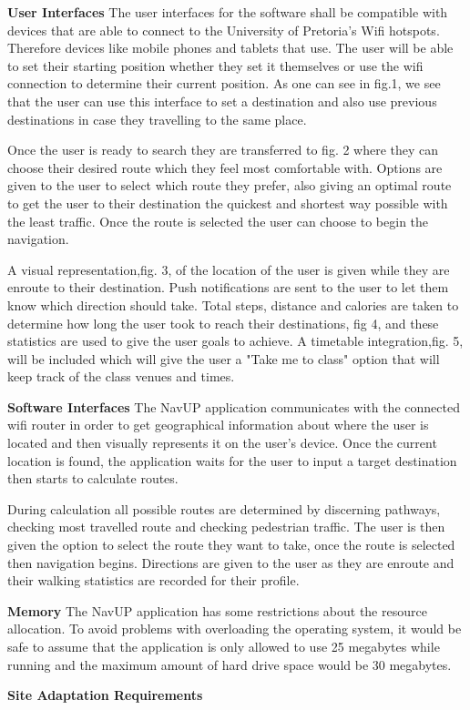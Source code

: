 \textbf{User Interfaces}
The user interfaces for the software shall be compatible with devices that are able to connect to the University of Pretoria's Wifi hotspots. Therefore devices like mobile phones and tablets that use. The user will be able to set their starting position whether they set it themselves or use the wifi connection to determine their current position. As one can see in fig.1, we see that the user can use this interface to set a destination and also use previous destinations in case they travelling to the same place. 

Once the user is ready to search they are transferred to fig. 2 where they can choose their desired route which they feel most comfortable with. Options are given to the user to select which route they prefer, also giving an optimal route to get the user to their destination the quickest and shortest way possible with the least traffic. Once the route is selected the user can choose to begin the navigation.

A visual representation,fig. 3, of the location of the user is given while they are enroute to their destination. Push notifications are sent to the user to let them know which direction should take. Total steps, distance and calories are taken to determine how long the user took to reach their destinations, fig 4, and these statistics are used to give the user goals to achieve. A timetable integration,fig. 5, will be included which will give the user a "Take me to class" option that will keep track of the class venues and times.


\textbf{Software Interfaces}
The NavUP application communicates with the connected wifi router in order to get geographical information about where the user is located and then visually represents it on the user's device. Once the current location is found, the application waits for the user to input a target destination then starts to calculate routes. 

During calculation all possible routes are determined by discerning pathways, checking most travelled route and checking pedestrian traffic. The user is then given the option to select the route they want to take, once the route is selected then navigation begins. Directions are given to the user as they are enroute and their walking statistics are recorded for their profile.


\textbf{Memory}
The NavUP application has some restrictions about the resource allocation. To avoid problems with overloading the operating system, it would be safe to assume that the application is only allowed to use 25 megabytes while running and the maximum amount of hard drive space would be 30 megabytes.


\textbf{Site Adaptation Requirements}
